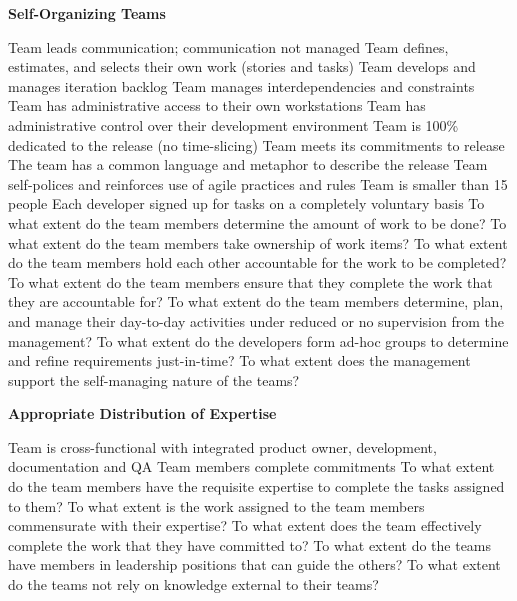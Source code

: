 \textbf{Self-Organizing Teams}
\begin{itemize}
	\taa Team leads communication; communication not managed
	\taa Team defines, estimates, and selects their own work (stories and tasks)
	\taar Team develops and manages iteration backlog
	\taar Team manages interdependencies and constraints %
	\taar Team has administrative access to their own workstations
	\taar Team has administrative control over their development environment
	\taar Team is 100\% dedicated to the release (no time-slicing)
	\taar Team meets its commitments to release
	\taar The team has a common language and metaphor to describe the release
	\taar Team self-polices and reinforces use of agile practices and rules
	\taar Team is smaller than 15 people
	\pam Each developer signed up for tasks on a completely voluntary basis
	\ops To what extent do the team members determine the amount of work to be done? 
	\ops To what extent do the team members take ownership of work items?
	\ops To what extent do the team members hold each other accountable for the work to be completed?
	\ops To what extent do the team members ensure that they complete the work that they are accountable for?
	\ops To what extent do the team members determine, plan, and manage their day-to-day activities under reduced or no supervision from the management?
	\ops To what extent do the developers form ad-hoc groups to determine and refine requirements just-in-time?
	\ops To what extent does the management support the self-managing nature of the teams?
\end{itemize}

\textbf{Appropriate Distribution of Expertise}
\begin{itemize}
	\taa Team is cross-functional with integrated product owner, development, documentation and QA
	\taa Team members complete commitments
	\ops To what extent do the team members have the requisite expertise to complete the tasks assigned to them?
	\ops To what extent is the work assigned to the team members commensurate with their expertise?
	\ops To what extent does the team effectively complete the work that they have committed to? 
	\ops To what extent do the teams have members in leadership positions that can guide the others?
	\ops To what extent do the teams not rely on knowledge external to their teams? 
\end{itemize}

